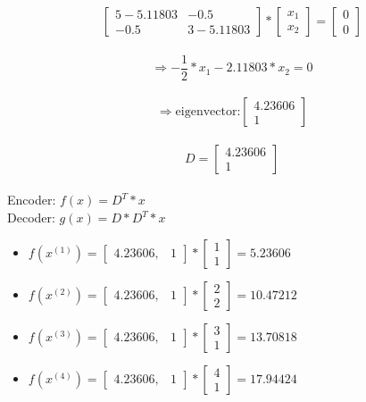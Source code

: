 \documentclass[12pt]{article}
\begin{document}
\begin{enumerate}[a)]
        		$$ \begin{bmatrix} 5-5.11803 & -0.5 \\ -0.5 & 3-5.11803 \end{bmatrix}* \begin{bmatrix} x_1 \\ x_2 \end{bmatrix}
        		=\begin{bmatrix} 0 \\ 0 \end{bmatrix} $$\\
        		$$ \Rightarrow -\frac{1}{2}*x_1 - 2.11803*x_2= 0 $$\\ 
        		$$ \Rightarrow  \text{eigenvector:}  \begin{bmatrix} 4.23606 \\ 1 \end{bmatrix} $$\\
        		$$ D= \begin{bmatrix} 4.23606 \\ 1 \end{bmatrix} $$\\
        		Encoder: $f(x)= D^T * x$\\
        		Decoder: $g(x)= D* D^T *x$\\
        		\begin{itemize}
        			\item $f(x^{(1)})= \begin{bmatrix} 4.23606, & 1 \end{bmatrix} * \begin{bmatrix} 1 \\ 1 \end{bmatrix} = 5.23606$
        			\item $f(x^{(2)})= \begin{bmatrix} 4.23606, & 1 \end{bmatrix} * \begin{bmatrix} 2 \\ 2 \end{bmatrix} = 10.47212$
        			\item $f(x^{(3)})= \begin{bmatrix} 4.23606, & 1 \end{bmatrix} * \begin{bmatrix} 3 \\ 1 \end{bmatrix} = 13.70818$
        			\item $f(x^{(4)})= \begin{bmatrix} 4.23606, & 1 \end{bmatrix} * \begin{bmatrix} 4 \\ 1 \end{bmatrix} = 17.94424$

\end{itemize}
\end{enumerate}
\end{document}
